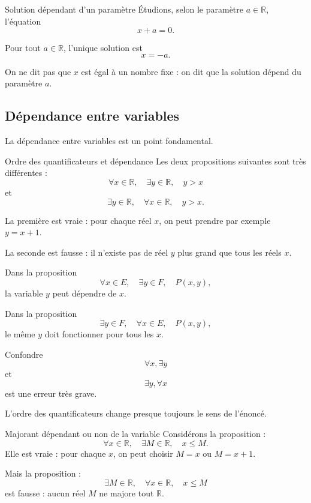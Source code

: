 \documentclass[11pt,a4paper]{article}
\begin{document}
\begin{exemplebox}{Solution dépendant d'un paramètre}{}
Étudions, selon le paramètre $a\in\mathbb{R}$, l'équation
\[
x+a=0.
\]

Pour tout $a\in\mathbb{R}$, l'unique solution est
\[
x=-a.
\]

On ne dit pas que $x$ est égal à un nombre fixe : on dit que la solution dépend du paramètre $a$.
\end{exemplebox}

\subsection{Dépendance entre variables}

La dépendance entre variables est un point fondamental.

\begin{exemplebox}{Ordre des quantificateurs et dépendance}{}
Les deux propositions suivantes sont très différentes :
\[
\forall x\in\mathbb{R},\quad \exists y\in\mathbb{R},\quad y>x
\]
et
\[
\exists y\in\mathbb{R},\quad \forall x\in\mathbb{R},\quad y>x.
\]

La première est vraie : pour chaque réel $x$, on peut prendre par exemple $y=x+1$.

La seconde est fausse : il n'existe pas de réel $y$ plus grand que tous les réels $x$.
\end{exemplebox}

Dans la proposition
\[
\forall x\in E,\quad \exists y\in F,\quad P(x,y),
\]
la variable $y$ peut dépendre de $x$.

Dans la proposition
\[
\exists y\in F,\quad \forall x\in E,\quad P(x,y),
\]
le même $y$ doit fonctionner pour tous les $x$.

\begin{erreurbox}
Confondre
\[
\forall x,\exists y
\]
et
\[
\exists y,\forall x
\]
est une erreur très grave.

L'ordre des quantificateurs change presque toujours le sens de l'énoncé.
\end{erreurbox}

\begin{exemplebox}{Majorant dépendant ou non de la variable}{}
Considérons la proposition :
\[
\forall x\in\mathbb{R},\quad \exists M\in\mathbb{R},\quad x\leq M.
\]
Elle est vraie : pour chaque $x$, on peut choisir $M=x$ ou $M=x+1$.

Mais la proposition :
\[
\exists M\in\mathbb{R},\quad \forall x\in\mathbb{R},\quad x\leq M
\]
est fausse : aucun réel $M$ ne majore tout $\mathbb{R}$.
\end{exemplebox}
\end{document}
